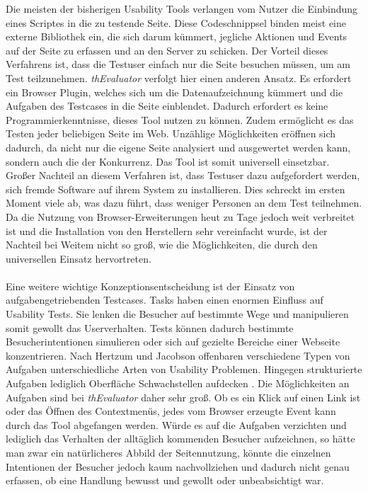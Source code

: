 Die meisten der bisherigen Usability Tools verlangen vom Nutzer die Einbindung eines Scriptes in die zu testende Seite. Diese Codeschnippsel binden meist eine externe Bibliothek ein, die sich darum kümmert, jegliche Aktionen und Events auf der Seite zu erfassen und an den Server zu schicken. Der Vorteil dieses Verfahrens ist, dass die Testuser einfach nur die Seite besuchen müssen, um am Test teilzunehmen. \textit{thEvaluator} verfolgt hier einen anderen Ansatz. Es erfordert ein Browser Plugin, welches sich um die Datenaufzeichnung kümmert und die Aufgaben des Testcases in die Seite einblendet. Dadurch erfordert es keine Programmierkenntnisse, dieses Tool nutzen zu können. Zudem ermöglicht es das Testen jeder beliebigen Seite im Web. Unzählige Möglichkeiten eröffnen sich dadurch, da nicht nur die eigene Seite analysiert und ausgewertet werden kann, sondern auch die der Konkurrenz. Das Tool ist somit universell einsetzbar. Großer Nachteil an diesem Verfahren ist, dass Testuser dazu aufgefordert werden, sich fremde Software auf ihrem System zu installieren. Dies schreckt im ersten Moment viele ab, was dazu führt, dass weniger Personen an dem Test teilnehmen. Da die Nutzung von Browser-Erweiterungen heut zu Tage jedoch weit verbreitet ist und die Installation von den Herstellern sehr vereinfacht wurde, ist der Nachteil bei Weitem nicht so groß, wie die Möglichkeiten, die durch den universellen Einsatz hervortreten.\\
\\
Eine weitere wichtige Konzeptionsentscheidung ist der Einsatz von aufgabengetriebenden Testcases. Tasks haben einen enormen Einfluss auf Usability Tests. Sie lenken die Besucher auf bestimmte Wege und manipulieren somit gewollt das Userverhalten. Tests können dadurch bestimmte Besucherintentionen simulieren oder sich auf gezielte Bereiche einer Webseite konzentrieren. Nach Hertzum und Jacobson offenbaren verschiedene Typen von Aufgaben unterschiedliche Arten von Usability Problemen. Hingegen strukturierte Aufgaben lediglich Oberfläche Schwachstellen aufdecken \cite{anzahlTestpersonen}. Die Möglichkeiten an Aufgaben sind bei \textit{thEvaluator} daher sehr groß. Ob es ein Klick auf einen Link ist oder das Öffnen des Contextmenüs, jedes vom Browser erzeugte Event kann durch das Tool abgefangen werden. Würde es auf die Aufgaben verzichten und lediglich das Verhalten der alltäglich kommenden Besucher aufzeichnen, so hätte man zwar ein natürlicheres Abbild der Seitennutzung, könnte die einzelnen Intentionen der Besucher jedoch kaum nachvollziehen und dadurch nicht genau erfassen, ob eine Handlung bewusst und gewollt oder unbeabsichtigt war.\\
